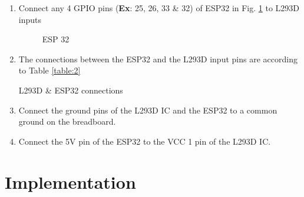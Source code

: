 \documentclass[conference]{IEEEtran}
\begin{document}
\begin{enumerate}[label=\thesection.\arabic*,ref=\thesection.\theenumi]
\item Connect any 4 GPIO pins (\textbf{Ex}: 25, 26, 33 \& 32) of ESP32 in Fig. \ref{fig:esp32} to L293D inputs
\begin{figure}[!ht]
\centering
{}%
\caption{ESP 32}
\label{fig:esp32}
\end{figure}
\item The connections between the ESP32 and the L293D input pins are according to Table \ref{table:2}
\begin{table}[h!]
  \centering
  
  \caption{L293D \& ESP32 connections}
  \label{table:2}
\end{table}

\item Connect the ground pins of the L293D IC and the ESP32 to a common ground on the breadboard.  

\item Connect the 5V pin of the ESP32 to the VCC 1 pin of the L293D IC.  

\end{enumerate}
%
\section{Implementation}
\end{document}
